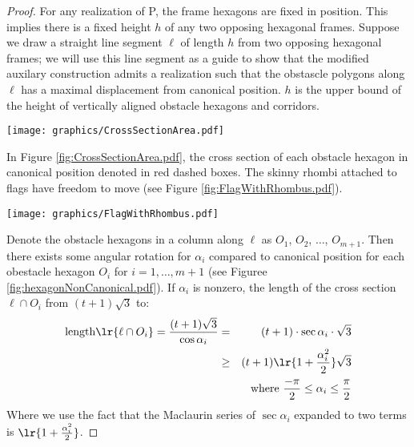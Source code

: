 \begin{proof}
For any realization of P, the frame hexagons are fixed in position.  
This implies there is a fixed height $h$ of any two opposing hexagonal frames.
Suppose we draw a straight line segment $\ell$ of length $h$ from two opposing hexagonal frames; we will use this line segment as a guide to show that the modified auxilary construction admits a realization such that the obstascle polygons along $\ell$ has a maximal displacement from canonical position.
$h$ is the upper bound of the height of vertically aligned obstacle hexagons and corridors.

\begin{minipage}{\linewidth}
\begin{center}
\texttt{[image: graphics/CrossSectionArea.pdf]}
\label{fig:CrossSectionArea.pdf}
\end{center}
\end{minipage}

In Figure \ref{fig:CrossSectionArea.pdf}, the cross section of each obstacle hexagon in canonical position denoted in red dashed boxes.
The skinny rhombi attached to flags have freedom to move (see Figure \ref{fig:FlagWithRhombus.pdf}).

\begin{minipage}{\linewidth}
\begin{center}
\texttt{[image: graphics/FlagWithRhombus.pdf]}
\label{fig:FlagWithRhombus.pdf}
\end{center}
\end{minipage}

Denote the obstacle hexagons in a column along $\ell$ as $O_1$, $O_2$, $\ldots$, $O_{m+1}$.
Then there exists some angular rotation for $\alpha_i$ compared to canonical position for each obestacle hexagon $O_i$ for $i = 1 , \ldots, m+1$ (see Figuree \ref{fig:hexagonNonCanonical.pdf}).
If $\alpha_i$ is nonzero, the length of the cross section $\ell \cap O_i$ from $(t+1) \sqrt{3}$ to:%
\begin{eqnarray*}
\text{length}\lr{\ell \cap O_i}=\frac{(t+1) \sqrt{3}}{\cos \alpha_i} &=& (t+1) \cdot \sec \alpha_i \cdot \sqrt{3}\\
&\geq& (t+1) \lr{1 + \frac{\alpha_i^2}{2}} \sqrt{3}\\
&&\text{ where } \frac{-\pi}{2} \leq \alpha_i \leq \frac{\pi}{2}
\end{eqnarray*}
Where we use the fact that the Maclaurin series of $\sec \alpha_i$ expanded to two terms is $\lr{1 + \frac{\alpha_i^2}{2}} $.


\end{proof}
